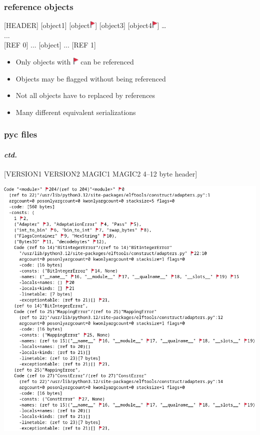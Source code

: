 \documentclass[]{beamer}
\newcommand{\flag}{\includegraphics[height=1em]{images/flag.png}}
\begin{document}
\begin{frame}
  \frametitle{reference objects}

  \hfill

  [HEADER] [object1] [object\flag] [object3] [object4\flag] … \\{}
  ...\\\pause
  {}[REF 0] ... [object] ... [REF 1]

  \vfill
  \pause

  \begin{itemize}
  \item Only objects with \flag{} can be referenced
  \item Objects may be flagged without being referenced
  \item Not all objects have to replaced by references
  \item Many different equivalent serializations
  \end{itemize}
\end{frame}

\begin{frame}
  \frametitle{pyc files}
  \framesubtitle{\textit{ctd.}}

  \pause

  [VERSION1 VERSION2 MAGIC1 MAGIC2 4–12 byte header]\\
\end{frame}

\begin{frame}
  \includegraphics[width=\textwidth]{images/pyc-dump.png}
\end{frame}
\end{document}
